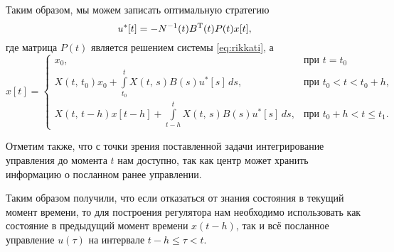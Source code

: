 Таким образом, мы можем записать оптимальную стратегию
\begin{equation} \label{eq:opt_control}
u^*[t] = -N^{-1}(t)B^\mathrm{T}(t) P(t)x[t],
\end{equation}
где матрица $P(t)$ является решением системы \eqref{eq:rikkati}, а 
\begin{equation*}
x[t] =
\begin{cases}
x_0,&\mbox{при }t = t_0\\
X(t,\,t_0)x_0 + \int\limits_{t_0}^{t}X(t,\,s)B(s)u^*[s]\,ds,
&\mbox{при }t_0 < t < t_0 + h,\\
X(t,\,t - h)x[t-h] + \int\limits_{t - h}^{t}X(t,\,s)B(s)u^*[s]\,ds,
&\mbox{при } t_0 + h < t \leqslant t_1.
\end{cases}
\end{equation*}

Отметим также, что с точки зрения поставленной задачи интегрирование управления до момента $t$ нам доступно, так как центр может хранить информацию о посланном ранее управлении.

Таким образом получили, что если отказаться от знания состояния в текущий момент времени, то для построения регулятора нам необходимо использовать как состояние в предыдущий момент времени $x(t - h)$, так и всё посланное управление $u(\tau)$ на интервале $t - h \leqslant \tau < t$.